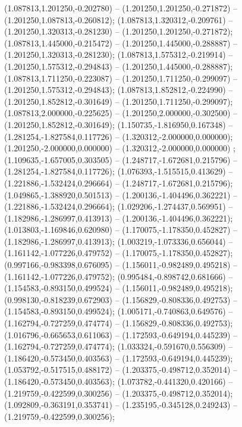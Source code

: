  (1.087813,1.201250,-0.202780) -- (1.201250,1.201250,-0.271872) -- (1.201250,1.087813,-0.260812);
 (1.087813,1.320312,-0.209761) -- (1.201250,1.320313,-0.281230) -- (1.201250,1.201250,-0.271872);
 (1.087813,1.445000,-0.215472) -- (1.201250,1.445000,-0.288887) -- (1.201250,1.320313,-0.281230);
 (1.087813,1.575312,-0.219914) -- (1.201250,1.575312,-0.294843) -- (1.201250,1.445000,-0.288887);
 (1.087813,1.711250,-0.223087) -- (1.201250,1.711250,-0.299097) -- (1.201250,1.575312,-0.294843);
 (1.087813,1.852812,-0.224990) -- (1.201250,1.852812,-0.301649) -- (1.201250,1.711250,-0.299097);
 (1.087813,2.000000,-0.225625) -- (1.201250,2.000000,-0.302500) -- (1.201250,1.852812,-0.301649);
 (1.150735,-1.816950,0.167348) -- (1.281254,-1.827584,0.117726) -- (1.320312,-2.000000,0.000000);
 (1.201250,-2.000000,0.000000) -- (1.320312,-2.000000,0.000000) ;
 (1.109635,-1.657005,0.303505) -- (1.248717,-1.672681,0.215796) -- (1.281254,-1.827584,0.117726);
 (1.076393,-1.515515,0.413629) -- (1.221886,-1.532424,0.296664) -- (1.248717,-1.672681,0.215796);
 (1.049865,-1.388920,0.501513) -- (1.200136,-1.404496,0.362221) -- (1.221886,-1.532424,0.296664);
 (1.029206,-1.274437,0.569951) -- (1.182986,-1.286997,0.413913) -- (1.200136,-1.404496,0.362221);
 (1.013803,-1.169846,0.620980) -- (1.170075,-1.178350,0.452827) -- (1.182986,-1.286997,0.413913);
 (1.003219,-1.073336,0.656044) -- (1.161142,-1.077226,0.479752) -- (1.170075,-1.178350,0.452827);
 (0.997166,-0.983398,0.676095) -- (1.156011,-0.982489,0.495218) -- (1.161142,-1.077226,0.479752);
 (0.995484,-0.898742,0.681666) -- (1.154583,-0.893150,0.499524) -- (1.156011,-0.982489,0.495218);
 (0.998130,-0.818239,0.672903) -- (1.156829,-0.808336,0.492753) -- (1.154583,-0.893150,0.499524);
 (1.005171,-0.740863,0.649576) -- (1.162794,-0.727259,0.474774) -- (1.156829,-0.808336,0.492753);
 (1.016796,-0.665653,0.611063) -- (1.172593,-0.649194,0.445239) -- (1.162794,-0.727259,0.474774);
 (1.033324,-0.591670,0.556309) -- (1.186420,-0.573450,0.403563) -- (1.172593,-0.649194,0.445239);
 (1.053792,-0.517515,0.488172) -- (1.203375,-0.498712,0.352014) -- (1.186420,-0.573450,0.403563);
 (1.073782,-0.441320,0.420166) -- (1.219759,-0.422599,0.300256) -- (1.203375,-0.498712,0.352014);
 (1.092809,-0.363191,0.353741) -- (1.235195,-0.345128,0.249243) -- (1.219759,-0.422599,0.300256);
